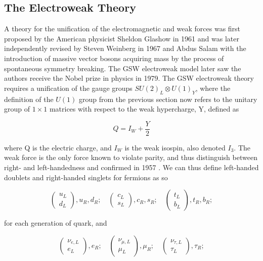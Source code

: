 \subsection{The Electroweak Theory} \label{subsec-ElectroweakTheory}

A theory for the unification of the electromagnetic and weak forces was first proposed by the American physicist Sheldon Glashow in 1961 \cite{Glashow:1961tr} and was later independently revised by Steven Weinberg in 1967 \cite{PhysRevLett.19.1264} and Abdus Salam \cite{Salam:1959zz} with the introduction of massive vector bosons acquiring mass by the process of spontaneous symmetry breaking. The GSW electroweak model later saw the authors receive the Nobel prize in physics in 1979. The GSW electroweak theory requires a unification of the gauge groups $SU(2)_L \otimes U(1)_Y$, where the definition of the $U(1)$ group from the previous section now refers to the unitary group of $1 \times 1$ matrices with respect to the weak hypercharge, Y, defined as 

\begin{equation}
Q = I_W + \frac{Y}{2}
\end{equation}

where Q is the electric charge, and $I_W$ is the weak isospin, also denoted $I_3$. The weak force is the only force known to violate parity, and thus distinguish between right- and left-handedness and confirmed in 1957 \cite{PhysRev.105.1413}. We can thus define left-handed doublets and right-handed singlets for fermions as so

\begin{equation}
\begin{pmatrix}
u_L \\
d_L
\end{pmatrix}
,u_R,d_R;
\quad
\begin{pmatrix}
c_L \\
s_L
\end{pmatrix}
,c_R, s_R;
\quad
\begin{pmatrix}
t_L \\
b_L
\end{pmatrix}
,t_R, b_R;
\end{equation}

for each generation of quark, and

\begin{equation}
\begin{pmatrix}
\nu_{e,L} \\
e_L
\end{pmatrix}
,e_R;
\quad
\begin{pmatrix}
\nu_{\mu,L} \\
\mu_L
\end{pmatrix}
,\mu_R;
\quad
\begin{pmatrix}
\nu_{\tau,L} \\
\tau_L
\end{pmatrix}
,\tau_R;
\end{equation}


